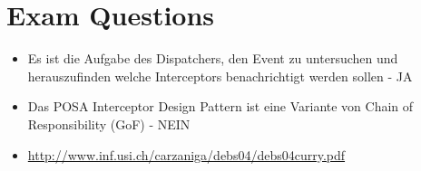 \section{Exam Questions}
\begin{itemize}
  \item Es ist die Aufgabe des Dispatchers, den Event zu untersuchen und herauszufinden welche Interceptors benachrichtigt werden sollen - JA
  \item Das POSA Interceptor Design Pattern ist eine Variante von Chain of Responsibility (GoF) - NEIN
\end{itemize}

\begin{additional}[Links]
  \begin{itemize}
    \item \url{http://www.inf.usi.ch/carzaniga/debs04/debs04curry.pdf}
  \end{itemize}
\end{additional}
